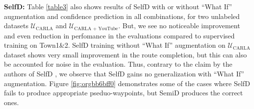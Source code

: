\documentclass[12pt, letterpaper,cleardoubleempty,BCOR1cm]{scrbook}
\begin{document}
\textbf{SelfD:} Table \ref{table3} also shows results of SelfD with or without ``What If''
augmentation and confidence prediction in all combinations, for two unlabeled
datasets \(\mathcal{U}_{\text{CARLA}}\) and \(\mathcal{U}_{\text{CARLA + YouTube}}\). But, we see no
noticeable improvement and even reduction in perfomance in the evaluations
compared to supervised training on Town1\&2. SelfD training without ``What If''
augmentation on \(\mathcal{U}_{\text{CARLA}}\) dataset shows very small improvement in the
route completion, but this can also be accounted for noise in the
evaluation. Thus, contrary to the claim by the authors of SelfD
\cite{Zhang2022a}, we observe that SelfD gains no generalization with ``What
If'' augmentation. Figure \ref{fig:orgbb6bff0} demonstrates some of the cases where
SelfD fails to produce appropriate pseduo-waypoints, but SemiD produces the
correct ones.
\end{document}

